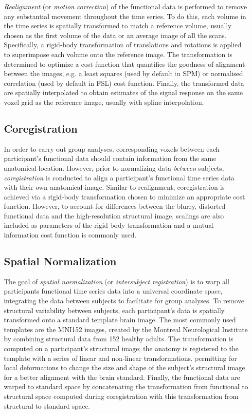 \textit{Realignment} (or \textit{motion correction}) of the functional data is performed to remove any substantial movement throughout the time series. To do this, each volume in the time series is spatially transformed to match a reference volume, usually chosen as the first volume of the data or an average image of all the scans. Specifically, a rigid-body transformation of translations and rotations is applied to superimpose each volume onto the reference image. The transformation is determined to optimize a cost function that quantifies the goodness of alignment between the images, e.g. a least squares (used by default in SPM) or normalised correlation (used by default in FSL) cost function. Finally, the transformed data are spatially interpolated to obtain estimates of the signal response on the same voxel grid as the reference image, usually with spline interpolation.

\subsection{Coregistration}

In order to carry out group analyses, corresponding voxels between each participant's functional data should contain information from the same  anatomical location. However, prior to normalizing data \textit{between} subjects, \textit{coregistration} is conducted to align a participant's functional time series data with their own anatomical image. Similar to realignment, coregistration is achieved via a rigid-body transformation chosen to minimize an appropriate cost function. However, to account for differences between the blurry, distorted functional data and the high-resolution structural image, scalings are also included as parameters of the rigid-body transformation and a mutual information cost function is commonly used.    

\subsection{Spatial Normalization}

The goal of \textit{spatial normalization} (or \textit{intersubject registration}) is to warp all participants functional time series data into a universal coordinate space, integrating the data between subjects to facilitate for group analyses. To remove structural variability between subjects, each participant's data is spatially transformed onto a standard template brain image. The most commonly used templates are the MNI152 images, created by the Montreal Neurological Institute by combining structural data from 152 healthy adults. The transformation is computed on a participant's structural image; the anatomy is registered to the template with a series of linear and non-linear transformations, permitting for local deformations to change the size and shape of the subject's structural image for a better alignment with the brain standard. Finally, the functional data are warped to standard space by concatenating the transformation from functional to structural space computed during coregistration with this transformation from structural to standard space. 

